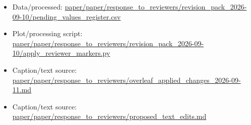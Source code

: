 \begin{itemize}[leftmargin=1.4em,noitemsep]
\item Data/processed: \begingroup\scriptsize\url{paper/paper/response_to_reviewers/revision_pack_2026-09-10/pending_values_register.csv}\endgroup
\item Plot/processing script: \begingroup\scriptsize\url{paper/paper/response_to_reviewers/revision_pack_2026-09-10/apply_reviewer_markers.py}\endgroup
\item Caption/text source: \begingroup\scriptsize\url{paper/paper/response_to_reviewers/overleaf_applied_changes_2026-09-11.md}\endgroup
\item Caption/text source: \begingroup\scriptsize\url{paper/paper/response_to_reviewers/proposed_text_edits.md}\endgroup
\end{itemize}
